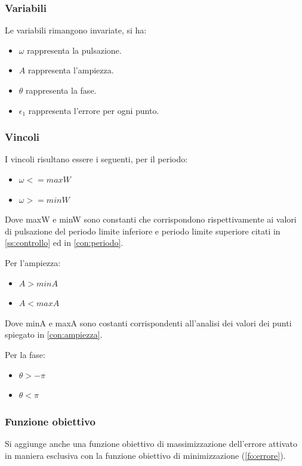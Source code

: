 \documentclass[a4paper,12pt]{report}
\begin{document}
\subsubsection{Variabili}
Le variabili rimangono invariate, si ha:
\begin{itemize}
  \item $\omega$ rappresenta la pulsazione.
  \item $A$ rappresenta l'ampiezza.
  \item $\theta$ rappresenta la fase.
  \item $\epsilon_1$ rappresenta l'errore per ogni punto.
\end{itemize}

\subsubsection{Vincoli}
I vincoli risultano essere i seguenti, per il periodo:
\begin{itemize}
  \item $\omega <= maxW$
  \item $\omega >= minW$
\end{itemize}
Dove maxW e minW sono constanti che corrispondono rispettivamente ai valori di pulsazione del periodo limite inferiore e periodo limite superiore citati in \ref{ss:controllo} ed in \ref{con:periodo}.

Per l'ampiezza:

\begin{itemize}
  \item $A > minA$
  \item $A < maxA$
\end{itemize}
Dove minA e maxA sono costanti corrispondenti all'analisi dei valori dei punti spiegato in \ref{con:ampiezza}.

Per la fase:

\begin{itemize}
  \item $\theta > -\pi$
  \item $\theta < \pi$
\end{itemize}

\subsubsection{Funzione obiettivo}

Si aggiunge anche una funzione obiettivo di massimizzazione dell'errore attivato in maniera esclusiva con la funzione obiettivo di minimizzazione (\ref{fo:errore}).
\end{document}
